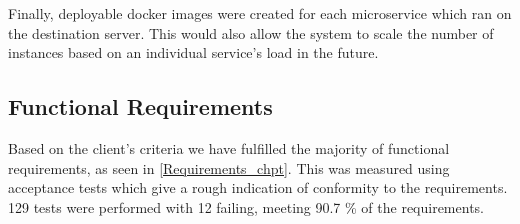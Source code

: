     Finally, deployable docker images were created for each microservice which ran on the destination server. This would also allow the system to scale the number of instances based on an individual service's load in the future.

\subsection{Functional Requirements}
    \par
    Based on the client's criteria we have fulfilled the majority of functional requirements, as seen in \ref{Requirements_chpt}. This was measured using acceptance tests which give a rough indication of conformity to the requirements. 129 tests were performed with 12 failing, meeting 90.7 \% of the requirements.